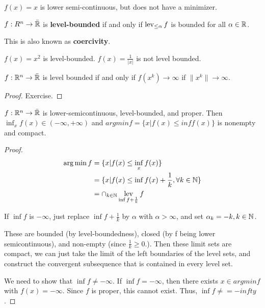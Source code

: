\begin{exmp}
  \label{defn:new_convex:7}
  $f(x) = x$ is lower semi-continuous, but does not have a minimizer.    
\end{exmp}

\begin{defn}
  \label{defn:new_convex:3}
  $f: R^{n} \rightarrow \bar {\mathbb{R}}$ is \textbf{level-bounded} if and only
  if $\operatorname*{lev}_{\leq \alpha} f$ is bounded for all $\alpha \in \mathbb{R}$.

  This is also known as \textbf{coercivity}.
\end{defn}

\begin{exmp}
  \label{defn:new_convex:4}
  $f(x) = x^{2}$ is level-bounded.  $f(x) = \frac{1}{|x|}$ is not level bounded.
\end{exmp}

\begin{thm}
  \label{defn:new_convex:5}
  $f: \mathbb{R}^{n} \rightarrow \bar {\mathbb{R}}$ is level bounded if and only if
  $f(x^{k}) \rightarrow \infty$ if $\| x^{k} \| \rightarrow \infty$.
\end{thm}

\begin{proof}
  Exercise.
\end{proof}


\begin{thm}
  \label{defn:new_convex:6}
  $f: \mathbb{R}^{n} \rightarrow \bar {\mathbb{R}}$ is lower-semicontinuous,
  level-bounded, and proper. Then $\inf_{x} f(x) \in (-\infty,
  +\infty)$ and $argmin f = \{ x | f(x) \leq inf f(x) \}$ is nonempty and compact.
\end{thm}

\begin{proof}
  \begin{align}
    \label{eq:9}
    \operatorname*{arg\,min} f &= \{ x | f(x) \leq \inf_{x} f(x) \} \\
    &= \{ x | f(x) \leq \inf f(x)  + \frac{1}{k}, \forall k \in \mathbb{N} \}
  \\
  &= \cap_{k \in \mathbb{N}} \operatorname*{lev}_{\inf f + \frac{1}{k}} f
\end{align}

 If $\inf f$ is $-\infty$, just replace $\inf f + \frac{1}{k}$ by
 $\alpha$ with $\alpha > \infty$, and set $\alpha_{k} = -k, k \in \mathbb{N}$.
 
 These are bounded (by level-boundedness), closed (by f
 being lower semicontinuous), and non-empty (since $\frac{1}{k} \geq
 0$.).  Then these limit sets are compact, we can just take the limit
 of the left boundaries of the level sets, and construct the
 convergent subsequence that is contained in every level set.

 We need to show that $\inf f \neq -\infty$.  If $\inf f = -\infty$,
 then there exists $x \in argmin f$ with $f(x) = -\infty$.  Since $f$
 is proper, this cannot exist. Thus, $\inf f \neq = -infty$.
\end{proof}

